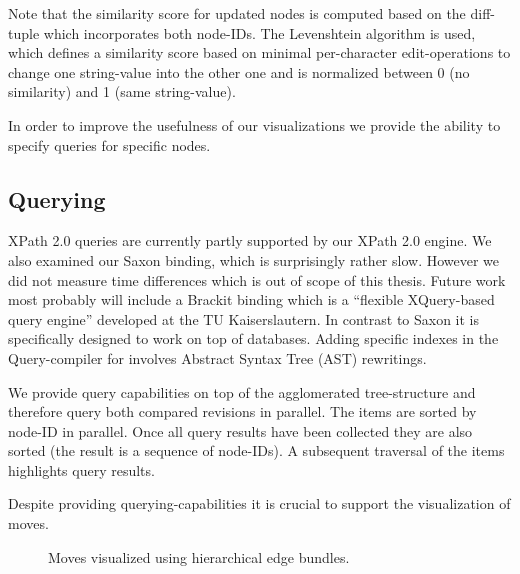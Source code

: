 Note that the similarity score for updated nodes is computed based on the diff-tuple which incorporates both node-IDs. The Levenshtein algorithm is used, which defines a similarity score based on minimal per-character edit-operations to change one string-value into the other one and is normalized between 0 (no similarity) and 1 (same string-value).

In order to improve the usefulness of our visualizations we provide the ability to specify queries for specific nodes.

\subsection{Querying}
XPath 2.0 queries are currently partly supported by our XPath 2.0 engine. We also examined our Saxon\cite{Saxon} binding, which is surprisingly rather slow. However we did not measure time differences which is out of scope of this thesis. Future work most probably will include a Brackit\cite{Brackit} binding which is a ``flexible XQuery-based query engine'' developed at the TU Kaiserslautern. In contrast to Saxon it is specifically designed to work on top of databases. Adding specific indexes in the Query-compiler for involves Abstract Syntax Tree (AST) rewritings.

We provide query capabilities on top of the agglomerated tree-structure and therefore query both compared revisions in parallel. The items are sorted by node-ID in parallel. Once all query results have been collected they are also sorted (the result is a sequence of node-IDs). A subsequent traversal of the items highlights query results.

Despite providing querying-capabilities it is crucial to support the visualization of moves.

\begin{figure}[tb]
\caption{\label{fig:moves} Moves visualized using hierarchical edge bundles.}
\end{figure}

